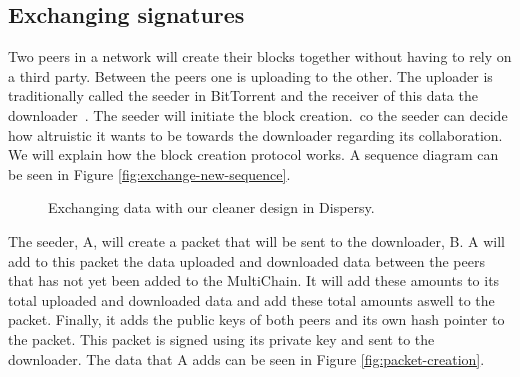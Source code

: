 \subsection{Exchanging signatures}
Two peers in a network will create their blocks together without having to rely on a third party.
Between the peers one is uploading to the other.
The uploader is traditionally called the seeder in BitTorrent and the receiver of this data the downloader~\cite{Cohen-bittorrent}.
The seeder will initiate the block creation.\,
co the seeder can decide how altruistic it wants to be towards the downloader regarding its collaboration.
We will explain how the block creation protocol works.
A sequence diagram can be seen in Figure \ref{fig:exchange-new-sequence}.

\begin{figure}[tpb]
\centering
{}

\caption{Exchanging data with our cleaner design in Dispersy.}
\label{fig:block-creation-new}
\end{figure}

The seeder, A, will create a packet that will be sent to the downloader, B.
A will add to this packet the data uploaded and downloaded data between the peers
that has not yet been added to the MultiChain.
It will add these amounts to its total uploaded and downloaded data
and add these total amounts aswell to the packet.
Finally, it adds the public keys of both peers and its own hash pointer to the packet.
This packet is signed using its private key and sent to the downloader.
The data that A adds can be seen in Figure \ref{fig:packet-creation}.


